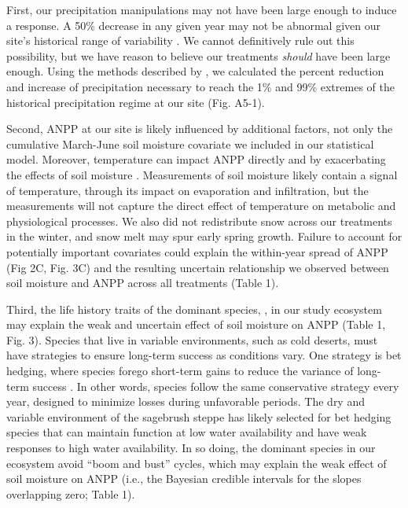 \documentclass[fleqn,10pt,lineno]{wlpeerj} %
\begin{document}
First, our precipitation manipulations may not have been large enough to
induce a response. A 50\% decrease in any given year may not be abnormal
given our site's historical range of variability \citep{Knapp2017}. We
cannot definitively rule out this possibility, but we have reason to
believe our treatments \emph{should} have been large enough. Using the
methods described by \citet{Lemoine2016}, we calculated the percent
reduction and increase of  precipitation necessary to
reach the 1\% and 99\% extremes of the historical precipitation regime
at our site (Fig. A5-1).

Second, ANPP at our site is likely influenced by additional factors, not
only the cumulative March-June soil moisture covariate we included in
our statistical model.  \citet{LaPierre2016}
Moreover, temperature can impact ANPP directly \citep{Epstein1997} and
by exacerbating the effects of soil moisture \citep{DeBoeck2011}.
Measurements of soil moisture likely contain a signal of temperature,
through its impact on evaporation and infiltration, but the measurements
will not capture the direct effect of temperature on metabolic and
physiological processes. We also did not redistribute snow across our
treatments in the winter, and snow melt may spur early spring growth.
Failure to account for potentially important covariates could explain
the within-year spread of ANPP (Fig 2C, Fig. 3C) and the resulting
uncertain relationship we observed between soil moisture and ANPP across
all treatments (Table 1).

Third, the life history traits of the dominant species,
 \citep{Smith2003}, in
our study ecosystem may explain the weak and uncertain effect of soil
moisture on ANPP (Table 1, Fig. 3). Species that live in variable
environments, such as cold deserts, must have strategies to ensure
long-term success as conditions vary. One strategy is bet hedging, where
species forego short-term gains to reduce the variance of long-term
success \citep{Seger1987}. In other words, species follow the same
conservative strategy every year, designed to minimize losses during
unfavorable periods. The dry and variable environment of the sagebrush
steppe has likely selected for bet hedging species that can maintain
function at low water availability and have weak responses to high water
availability. In so doing, the dominant species in our ecosystem avoid
``boom and bust'' cycles, which may explain the weak effect of soil
moisture on ANPP (i.e., the Bayesian credible intervals for the slopes
overlapping zero; Table 1).
\end{document}
